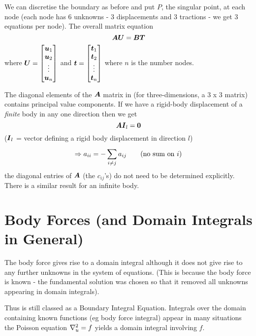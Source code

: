We can discretise the boundary as before and put $P$, the singular point, at
each node (each node has $6$ unknowns - $3$ displacements and $3$ tractions - we get
$3$ equations per node). The overall matrix equation
\begin{equation}
  \matr{A}\vectr{U}=\matr{B}\vectr{T}
  \label{eqn:matrix}
\end{equation}
where $ \boldsymbol{U}  = 
\begin{bmatrix}
   \boldsymbol{u} _{1} \\ 
   \boldsymbol{u} _{2} \\ 
  \vdots \\ 
   \boldsymbol{u} _{n}
\end{bmatrix} $ and  $  \boldsymbol{t}  = 
\begin{bmatrix}
   \boldsymbol{t} _{1} \\
   \boldsymbol{t} _{2} \\ 
  \vdots \\
   \boldsymbol{t} _{n}
\end{bmatrix}$ where $n$ is the number nodes.

The diagonal elements of the $\matr{A}$ matrix in  
(for three-dimensions, a $3$ x $3$
matrix) contains principal value components. If we have a rigid-body
displacement of a \emph{finite} body in any one direction then we get
\begin{equation*}
  \matr{A}\vectr{I}_{l} = \vectr{0}
\end{equation*}
($ \boldsymbol{I} _{l}$ = vector defining a rigid body displacement in direction $l$)
\begin{displaymath}
    \Rightarrow a_{ii} = - \displaystyle\sum_{i\neq j}^{} a_{ij} \qquad \text{(no sum on $i$)} 
\end{displaymath} 
\ie the diagonal entries of $\matr{A}$ (the $c_{ij}$'s) do not need to be
determined explicitly. There is a similar result for an infinite body.

\section{Body Forces (and Domain Integrals in General)}

The body force gives rise to a domain integral although it does not give rise
to any further unknowns in the system of equations.  (This is because the body
force is known - the fundamental solution was chosen so that it removed all
unknowns appearing in domain integrals).

Thus  is still classed as a Boundary Integral Equation.
Integrals over the domain containing known functions (eg body force integral)
appear in many situations \eg the Poisson equation $\laplacian{u}=f$ yields a
domain integral involving $f$.

